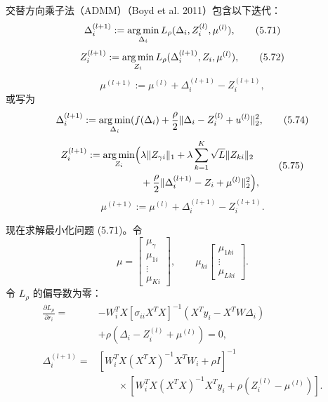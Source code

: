 交替方向乘子法（ADMM）（Boyd et al. 2011）包含以下迭代：
\begin{equation}
\Delta_i^{(l+1)}:=\operatorname*{arg\,min}_{\Delta_i}L_\rho(\Delta_i,Z_i^{(l)},\mu^{(l)}),
\tag{5.71}
\end{equation}
\begin{equation}
Z_i^{(l+1)}:=\operatorname*{arg\,min}_{Z_i}L_\rho(\Delta_i^{(l+1)},Z_i,\mu^{(l)}),
\tag{5.72}
\end{equation}
\begin{equation}
\mu^{(l+1)}:=\mu^{(l)}+\Delta_i^{(l+1)}-Z_i^{(l+1)},
\tag{5.73}
\end{equation}
或写为
\begin{equation}
\Delta_i^{(l+1)}:=\operatorname*{arg\,min}_{\Delta_i}
(f(\Delta_i)+\frac\rho2\lVert\Delta_i-Z_i^{(l)}+u^{(l)}\rVert_2^2,
\tag{5.74}
\end{equation}
\begin{equation}
\begin{aligned}
Z_i^{(l+1)}:=\operatorname*{arg\,min}_{Z_i}\Bigl(&\lambda\lVert Z_{\gamma i}\rVert_1
+\lambda\sum_{k=1}^K\sqrt L\lVert Z_{ki}\rVert_2\\
&+\frac\rho2\lVert\Delta_i^{(l+1)}-Z_i+\mu^{(l)}\rVert_2^2\Bigr),
\end{aligned}
\tag{5.75}
\end{equation}
\begin{equation}
\mu^{(l+1)}:=\mu^{(l)}+\Delta_i^{(l+1)}-Z_i^{(l+1)}.
\tag{5.76}
\end{equation}

现在求解最小化问题 (5.71)。令
\[
\mu=\begin{bmatrix}\mu_\gamma\\\mu_{1i}\\\vdots\\\mu_{Ki}\end{bmatrix},\qquad
\mu_{ki}\begin{bmatrix}\mu_{1ki}\\\vdots\\\mu_{Lki}\end{bmatrix}.
\]
令 $L_\rho$ 的偏导数为零：
\begin{equation}
\begin{aligned}
\frac{\partial L_\rho}{\partial r_i}
={}&-W_i^TX[\sigma_{ii}X^TX]^{-1}(X^Ty_i-X^TW\Delta_i)\\
&+\rho(\Delta_i-Z_i^{(l)}+\mu^{(l)})=0,\\
\Delta_i^{(l+1)}
={}&[W_i^TX(X^TX)^{-1}X^TW_i+\rho I]^{-1}\\
&\qquad\times[W_i^TX(X^TX)^{-1}X^Ty_i+\rho(Z_i^{(l)}-\mu^{(l)})].
\end{aligned}
\tag{5.77}
\end{equation}

